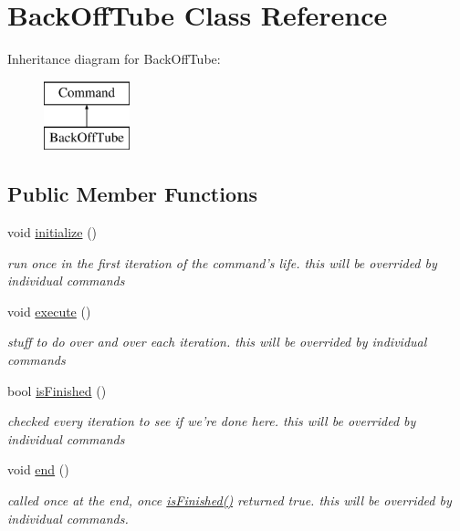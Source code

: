 \hypertarget{classBackOffTube}{\section{Back\-Off\-Tube Class Reference}
\label{classBackOffTube}
}
Inheritance diagram for Back\-Off\-Tube\-:\begin{figure}[H]
\begin{center}
\leavevmode
\includegraphics[height=2.000000cm]{classBackOffTube}
\end{center}
\end{figure}
\subsection*{Public Member Functions}
\begin{DoxyCompactItemize}
\item 
\hypertarget{classBackOffTube_a16b83364009db3cb58ec6c09458a8741}{void \hyperlink{classBackOffTube_a16b83364009db3cb58ec6c09458a8741}{initialize} ()}\label{classBackOffTube_a16b83364009db3cb58ec6c09458a8741}

\begin{DoxyCompactList}\small\item\em run once in the first iteration of the command's life. this will be overrided by individual commands \end{DoxyCompactList}\item 
\hypertarget{classBackOffTube_a9d40125cdd95f7ca2db13a5d48e91a93}{void \hyperlink{classBackOffTube_a9d40125cdd95f7ca2db13a5d48e91a93}{execute} ()}\label{classBackOffTube_a9d40125cdd95f7ca2db13a5d48e91a93}

\begin{DoxyCompactList}\small\item\em stuff to do over and over each iteration. this will be overrided by individual commands \end{DoxyCompactList}\item 
bool \hyperlink{classBackOffTube_abda2334a9432829830a51195a9cce4e6}{is\-Finished} ()
\begin{DoxyCompactList}\small\item\em checked every iteration to see if we're done here. this will be overrided by individual commands \end{DoxyCompactList}\item 
\hypertarget{classBackOffTube_a6753fa3b5148d3b8cc06b8e2f7f02be7}{void \hyperlink{classBackOffTube_a6753fa3b5148d3b8cc06b8e2f7f02be7}{end} ()}\label{classBackOffTube_a6753fa3b5148d3b8cc06b8e2f7f02be7}

\begin{DoxyCompactList}\small\item\em called once at the end, once \hyperlink{classBackOffTube_abda2334a9432829830a51195a9cce4e6}{is\-Finished()} returned true. this will be overrided by individual commands. \end{DoxyCompactList}\end{DoxyCompactItemize}

